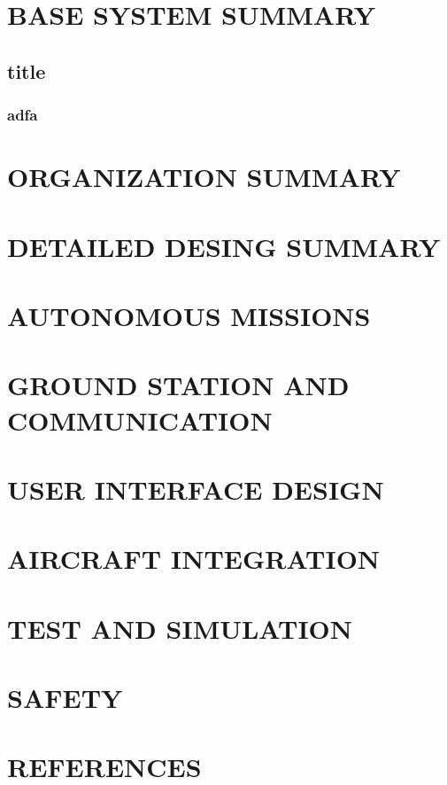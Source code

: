 \documentclass[12pt]{article}
\begin{document}
\section{BASE SYSTEM SUMMARY}
\subsection{title}
\subsubsection{adfa}
\Blindtext
\section{ORGANIZATION SUMMARY}
\cite[aasdfjasdf]{greenwade93}
\section{DETAILED DESING SUMMARY}

\section{AUTONOMOUS MISSIONS}

\section{GROUND STATION AND COMMUNICATION}

\section{USER INTERFACE DESIGN}

\section{AIRCRAFT INTEGRATION}

\section{TEST AND SIMULATION}

\section{SAFETY}

\section{REFERENCES}

\singlespacing
 

\end{document}
